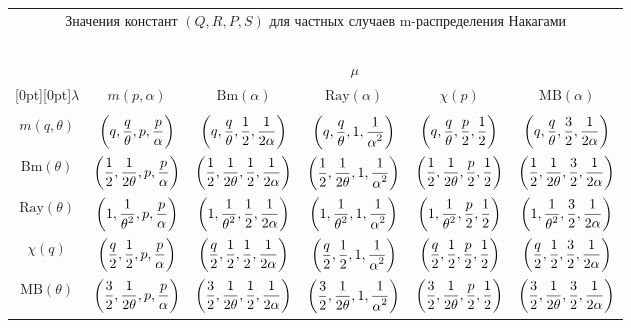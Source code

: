 \begin{multicols}{2}
\begin{table*}
\begin{center}
\begin{tabular}{|c|c|c|c|c|c|}
\multicolumn{6}{c}{Значения констант $(Q,R,P,S)$ для частных случаев m-распределения Накагами}\\
\multicolumn{6}{c}{\ }\\[-6pt]
\hline
&\multicolumn{5}{c|}{$\mu$}\\
\cline{2-6}
\multicolumn{1}{|c|}{\raisebox{6pt}[0pt][0pt]{$\lambda$}}
& $m\left(p,\alpha\right)$&$\mathrm{Bm}\left(\alpha\right)$& 
$\mathrm{Ray}\left(\alpha\right)$& $\chi\left(p\right)$& $\mathrm{MB}\left(\alpha\right)$\\
\hline
&&&&&\\[-9pt]
 $m\left(q,\theta\right)$& $\left(q,\fr{q}{\theta},p,\fr{p}{\alpha}\right)$& $\left(q,\fr{q}{\theta},\fr{1}{2},\fr{1}{2\alpha}\right)$& $\left(q,\fr{q}{\theta},1,\fr{1}{\alpha^2}\right)$& $\left(q,\fr{q}{\theta},\fr{p}{2},\fr{1}{2}\right)$& 
 $\left(q,\fr{q}{\theta},\fr{3}{2},\fr{1}{2\alpha}\right)$\\
 $\mathrm{Bm}\left(\theta\right)$& $\left(\fr{1}{2},\fr{1}{2\theta},p,\fr{p}{\alpha}\right)$& $\left(\fr{1}{2},\fr{1}{2\theta},\fr{1}{2},\fr{1}{2\alpha}\right)$& $\left(\fr{1}{2},\fr{1}{2\theta},1,\fr{1}{\alpha^2}\right)$& $\left(\fr{1}{2},\fr{1}{2\theta},\fr{p}{2},\fr{1}{2}\right)$& $\left(\fr{1}{2},\fr{1}{2\theta},\fr{3}{2},\fr{1}{2\alpha}\right)$\\
 $\mathrm{Ray}\left(\theta\right)$& $\left(1,\fr{1}{\theta^2},p,\fr{p}{\alpha}\right)$& $\left(1,\fr{1}{\theta^2},\fr{1}{2},\fr{1}{2\alpha}\right)$& $\left(1,\fr{1}{\theta^2},1,\fr{1}{\alpha^2}\right)$& $\left(1,\fr{1}{\theta^2},\fr{p}{2},\fr{1}{2}\right)$& $\left(1,\fr{1}{\theta^2},\fr{3}{2},\fr{1}{2\alpha}\right)$\\
 $\chi\left(q\right)$& $\left(\fr{q}{2},\fr{1}{2},p,\fr{p}{\alpha}\right)$& $\left(\fr{q}{2},\fr{1}{2},\fr{1}{2},\fr{1}{2\alpha}\right)$& $\left(\fr{q}{2},\fr{1}{2},1,\fr{1}{\alpha^2}\right)$& $\left(\fr{q}{2},\fr{1}{2},\fr{p}{2},\fr{1}{2}\right)$& $\left(\fr{q}{2},\fr{1}{2},\fr{3}{2},\fr{1}{2\alpha}\right)$\\
 $\mathrm{MB}\left(\theta\right)$& $\left(\fr{3}{2},\fr{1}{2\theta},p,\fr{p}{\alpha}\right)$& $\left(\fr{3}{2},\fr{1}{2\theta},\fr{1}{2},\fr{1}{2\alpha}\right)$& $\left(\fr{3}{2},\fr{1}{2\theta},1,\fr{1}{\alpha^2}\right)$& $\left(\fr{3}{2},\fr{1}{2\theta},\fr{p}{2},\fr{1}{2}\right)$& $\left(\fr{3}{2},\fr{1}{2\theta},\fr{3}{2},\fr{1}{2\alpha}\right)$\\
\hline
\end{tabular}
\end{center}
\end{table*}


\end{multicols}
